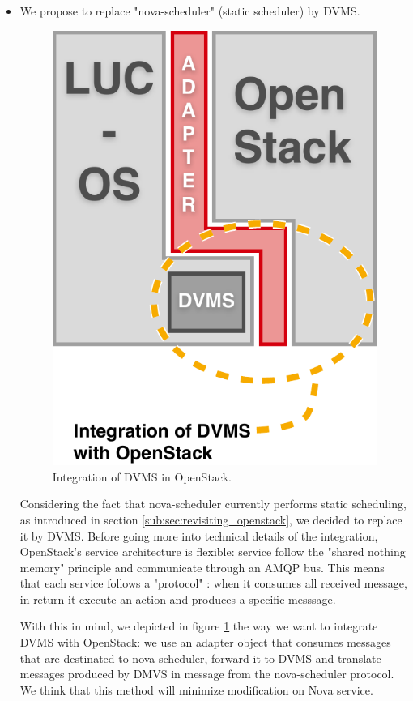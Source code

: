 \begin{itemize}

\item We propose to replace "nova-scheduler" (static scheduler) by DVMS.

\begin{figure}[h]
	\centering
	\includegraphics[width=0.50\linewidth]{Figures/dvms_openstack.pdf}
	\caption{Integration of DVMS in OpenStack.}%
	\label{fig:integration}%
\end{figure}





Considering the fact that nova-scheduler currently performs static scheduling, 
as introduced in section \ref{sub:sec:revisiting_openstack}, we decided to 
replace it by DVMS. Before going more into technical details of the integration,
OpenStack's service architecture is flexible: service follow the "shared nothing
memory" principle and communicate through an AMQP bus. This means that each 
service follows a "protocol" : when it consumes all received message, in return
it execute an action and produces a specific messsage. 

With this in mind, we depicted in figure \ref{fig:integration} the way we want 
to integrate DVMS with OpenStack: we use an adapter object that consumes 
messages that are destinated to nova-scheduler, forward it to DVMS and translate
messages produced by DMVS in message from the nova-scheduler protocol. We think
that this method will minimize modification on Nova service.

\end{itemize}